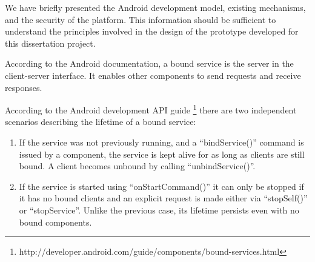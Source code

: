 We have briefly presented the Android development model, existing mechanisms, and the security of the platform. This information should be sufficient to understand the principles involved in the design of the prototype developed for this dissertation project.


According to the Android documentation, a bound service is the server in the client-server interface. It enables other components to send requests and receive responses.


According to the Android development API guide \footnote{http://developer.android.com/guide/components/bound-services.html} there are two independent scenarios describing the lifetime of a bound service:
\begin{enumerate}
	\item If the service was not previously running, and a ``bindService()'' command is issued by a component, the service is kept alive for as long as clients are still bound. A client becomes unbound by calling ``unbindService()''.
	
	\item If the service is started using ``onStartCommand()'' it can only be stopped if it has no bound clients and an explicit request is made either via ``stopSelf()'' or ``stopService''. Unlike the previous case, its lifetime persists even with no bound components.
\end{enumerate}
